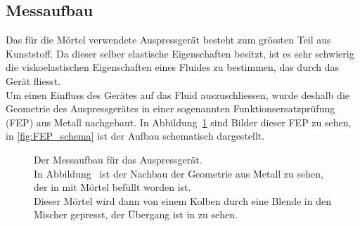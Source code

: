 \subsection{Messaufbau}
Das für die Mörtel verwendete Auspressgerät besteht zum grössten Teil aus Kunststoff. Da dieser selber elastische Eigenschaften besitzt, ist es sehr schwierig die viskoelastischen Eigenschaften eines Fluides zu bestimmen, das durch das Gerät fliesst.\\
Um einen Einfluss des Gerätes auf das Fluid auszuschliessen, wurde deshalb die Geometrie des Auspressgerätes in einer sogenannten Funktionsersatzprüfung (FEP) aus Metall nachgebaut. In Abbildung~\ref{fig:FEP} sind Bilder dieser FEP zu sehen, in \ref{fig:FEP_schema} ist der Aufbau schematisch dargestellt.
%
\begin{figure}[hbt]
    \centering
    \caption{Der Messaufbau für das Auspressgerät.\\In Abbildung~ ist der Nachbau der Geometrie aus Metall zu sehen, der in  mit Mörtel befüllt worden ist.\\
    Dieser Mörtel wird dann von einem Kolben durch eine Blende in den Mischer gepresst, der Übergang ist in  zu sehen.}
    \label{fig:FEP}
\end{figure}
